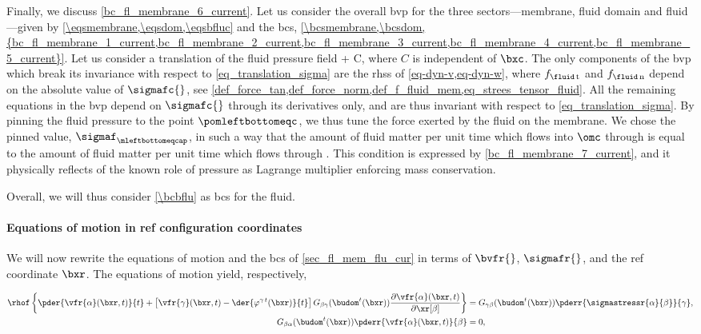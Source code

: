 Finally, we discuss \cref{bc_fl_membrane_6_current}. Let us consider the overall \ac{bvp} for the three sectors---membrane, fluid domain and fluid---given by \cref{\eqsmembrane,\eqsdom,\eqsbfluc} and the \acp{bc}, \cref{\bcsmembrane,\bcsdom,{bc_fl_membrane_1_current,bc_fl_membrane_2_current,bc_fl_membrane_3_current,bc_fl_membrane_4_current,bc_fl_membrane_5_current}}. Let us consider a translation of the fluid pressure field
\be \label{eq_translation_sigma}
\sigmafc{}{} \rightarrow \sigmafc{} + C,
\ee
where $C$ is independent of $\bxc$. The only components of the \ac{bvp} which break its invariance with respect to \cref{eq_translation_sigma} are the \acp{rhs} of \cref{eq-dyn-v,eq-dyn-w}, where $f_{\fluid\, \text{t}}$ and $\fflun$ depend on the absolute value of $\sigmafc{}$, see \cref{def_force_tan,def_force_norm,def_f_fluid_mem,eq_strees_tensor_fluid}. All the remaining equations in the \ac{bvp} depend on $\sigmafc{}$ through its derivatives only, and are thus invariant with respect to  \cref{eq_translation_sigma}.
By pinning the fluid pressure to the point $\pomleftbottomeqc$, we  thus tune the force exerted by the fluid on the membrane. We chose the pinned value, $\sigmafleftbottomc$, in such a way that the amount of fluid matter  per unit time which flows into $\omc$ through \pombottomc{} is equal to the amount of fluid matter per unit time which flows through \pomtopc. This condition is expressed by \cref{bc_fl_membrane_7_current}, and it physically reflects of the known role of pressure as Lagrange multiplier enforcing mass conservation.

Overall, we will thus consider \cref{\bcbflu} as \acp{bc} for the fluid.

\paragraph{Equations of motion in  \acl{ref} configuration coordinates}
\label{sec_fl_mem_flu_ref}

We will now rewrite the equations of motion and the \acp{bc} of \cref{sec_fl_mem_flu_cur} in terms of $\bvfr{}$, $\sigmafr{}$, and the \ac{ref} coordinate $\bxr$. The equations of motion \crefs{\eqsbfluc} yield, respectively,


\bw
\begin{align}
    \label{eq_fl_rigid_fl_1_reference}
    \rhof \left\{ \pder{ \vfr{\alpha}(\bxr, t)}{t} + \left[ \vfr{\gamma}(\bxr, t)  - \der{\varphi^{\gamma\, t}(\bxr)}{t}\right]  G_{\beta \gamma}(\budom^t(\bxr)) \frac{\partial  \vfr{\alpha}(\bxr, t)}{\partial \xr[\beta]} \right\} & =
    G_{\gamma \beta}(\budom^t(\bxr))  \pderr{\sigmastressr{\alpha}{\beta}}{\gamma},                                                                                                                                                           \\
    \label{eq_fl_rigid_fl_2_reference}
    G_{\beta \alpha}(\budom^t(\bxr)) \pderr{ \vfr{\alpha}(\bxr, t)}{\beta}                                                                                                                                                             & = 0,
\end{align}
\ew

